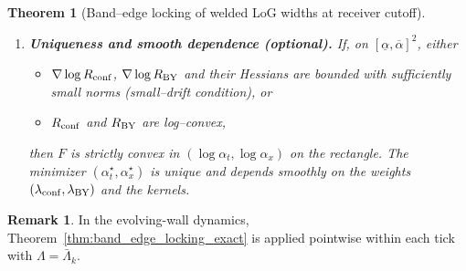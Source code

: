 \documentclass[10pt]{article}
\theoremstyle{definition}
\newtheorem{remark}{Remark}[section]
\theoremstyle{plain}
\newtheorem{theorem}{Theorem}[section]
\begin{document}
\begin{theorem}[Band–edge locking of welded LoG widths at receiver cutoff]
\begin{enumerate}
\item[(v)] \textbf{Uniqueness and smooth dependence (optional).}
If, on $[\underline\alpha,\overline\alpha]^2$, either
\begin{itemize}
\item[\emph{(a)}] $\nabla\log R_{\rm conf}$, $\nabla\log R_{\rm BY}$ and their Hessians are bounded with sufficiently small norms (small–drift condition), or
\item[\emph{(b)}] $R_{\rm conf}$ and $R_{\rm BY}$ are log–convex,
\end{itemize}
then $F$ is strictly convex in $(\log\alpha_t,\log\alpha_x)$ on the rectangle. The minimizer $(\alpha_t^\star,\alpha_x^\star)$
is unique and depends smoothly on the weights $(\lambda_{\rm conf},\lambda_{\rm BY})$ and the kernels.
\end{enumerate}
\end{theorem}

\begin{remark}
\label{rem:uom-main-005}
In the evolving-wall dynamics, Theorem~\ref{thm:band_edge_locking_exact} is applied
pointwise within each tick with $\Lambda=\bar\Lambda_k$.
\end{remark}
\end{document}
